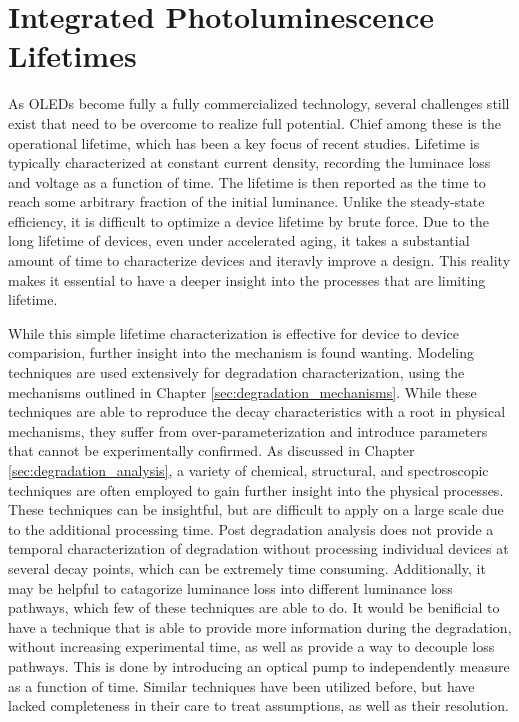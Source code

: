 \documentclass[../thesis.tex]{subfiles}
\begin{document}
\chapter{Integrated Photoluminescence Lifetimes} \label{sec:integrated_lifetime}
As OLEDs become fully a fully commercialized technology, several challenges still exist that need to be overcome to realize full potential.
Chief among these is the operational lifetime, which has been a key focus of recent studies.\supercite{Scholz2015,DeMoraes2011,Seifert2013b,Moraes2011,Burrows1994,Seifert2013b}
Lifetime is typically characterized at constant current density, recording the luminace loss and voltage as a function of time.
The lifetime is then reported as the time to reach some arbitrary fraction of the initial luminance.
Unlike the steady-state efficiency, it is difficult to optimize a device lifetime by brute force.  
Due to the long lifetime of devices, even under accelerated aging, it takes a substantial amount of time to characterize devices and iteravly improve a design.
This reality makes it essential to have a deeper insight into the processes that are limiting lifetime.

While this simple lifetime characterization is effective for device to device comparision, further insight into the mechanism is found wanting.
Modeling techniques are used extensively for degradation characterization, using the mechanisms outlined in Chapter \ref{sec:degradation_mechanisms}.\supercite{Giebink2008a,Ingram2017,Coburn2017}
While these techniques are able to reproduce the decay characteristics with a root in physical mechanisms, they suffer from over-parameterization and introduce parameters that cannot be experimentally confirmed.
As discussed in Chapter \ref{sec:degradation_analysis}, a variety of chemical, structural, and spectroscopic techniques are often employed to gain further insight into the physical processes.\supercite{Seifert2013b,Moraes2011,Scholz2015,Wang2011a,Zhang2016}
These techniques can be insightful, but are difficult to apply on a large scale due to the additional processing time.
Post degradation analysis does not provide a temporal characterization of degradation without processing individual devices at several decay points, which can be extremely time consuming.
Additionally, it may be helpful to catagorize luminance loss into different luminance loss pathways, which few of these techniques are able to do.
It would be benificial to have a technique that is able to provide more information during the degradation, without increasing experimental time, as well as provide a way to decouple loss pathways.
This is done by introducing an optical pump to independently measure \pl as a function of time.
Similar techniques have been utilized before, but have lacked completeness in their care to treat assumptions, as well as their resolution.\supercite{Popovic2001,Kondakov2007d,Winter2008a}
\end{document}
